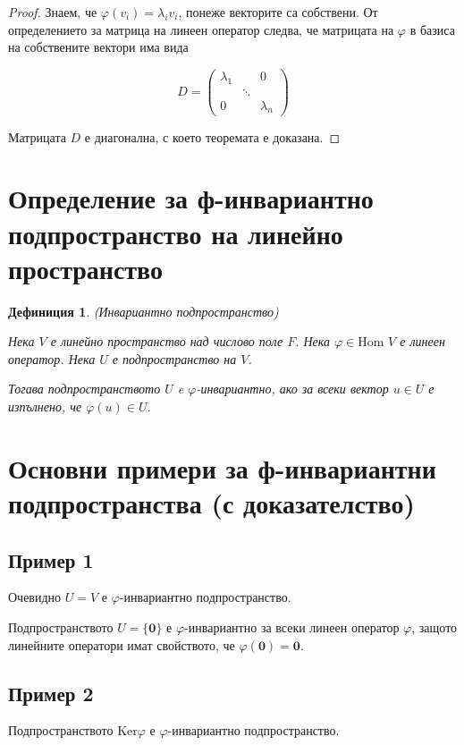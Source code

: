 \documentclass{scrartcl}
\newtheorem{definition}{Дефиниция}
\begin{document}
\begin{FlushLeft}
\begin{proof}
Знаем, че $\varphi(v_i) = \lambda_i v_i$, понеже векторите са собствени. От определението за матрица на линеен оператор следва, че матрицата на $\varphi$ в базиса на собствените вектори има вида

$$
D =
\begin{pmatrix}
    \lambda_1 & & 0\\
    & \ddots &\\
    0 & & \lambda_n
\end{pmatrix}
$$

Матрицата $D$ е диагонална, с което теоремата е доказана.
\end{proof}

\section{Определение за ф-инвариантно
подпространство на линейно пространство}

\begin{definition}
(Инвариантно подпространство)

Нека $V$ е линейно пространство над числово поле $F$.
Нека $\varphi \in \text{Hom }{V}$ е линеен оператор.
Нека $U$ е подпространство на $V$.

Тогава подпространството $U$ e $\varphi$-инвариантно, ако за всеки вектор $u \in U$ е изпълнено, че $\varphi(u) \in U$.
\end{definition}

\section{Основни примери за ф-инвариантни
подпространства (с доказателство)}

\subsection*{Пример 1}

Очевидно $U = V$ е $\varphi$-инвариантно подпространство.

Подпространството $U = \lbrace \mathbf{0} \rbrace$ е $\varphi$-инвариантно за всеки линеен оператор $\varphi$, защото линейните оператори имат свойството, че $\varphi(\mathbf{0}) = \mathbf{0}$.

\subsection*{Пример 2}

Подпространството $\text{Ker}\varphi$ е $\varphi$-инвариантно подпространство.


\end{FlushLeft}
\end{document}
